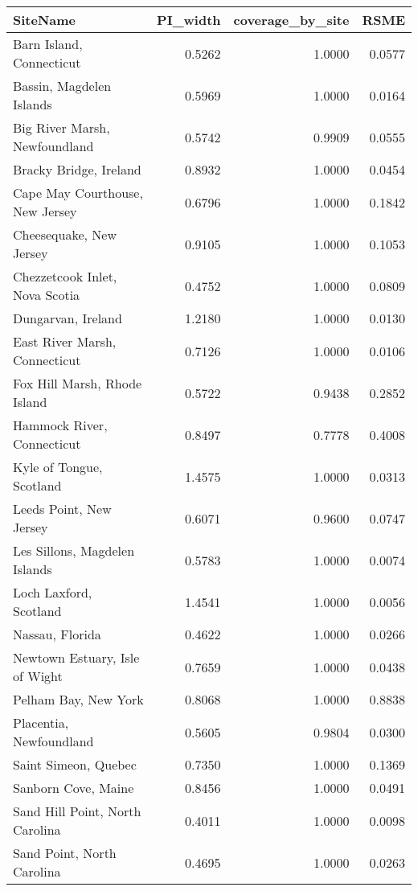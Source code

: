 \begin{table}[ht]
\centering
\begin{tabular}{lrrr}
  \hline
SiteName & PI\_width & coverage\_by\_site & RSME \\ 
  \hline
Barn Island,
 Connecticut & 0.5262 & 1.0000 & 0.0577 \\ 
  Bassin,
 Magdelen Islands & 0.5969 & 1.0000 & 0.0164 \\ 
  Big River Marsh,
 Newfoundland & 0.5742 & 0.9909 & 0.0555 \\ 
  Bracky Bridge,
 Ireland & 0.8932 & 1.0000 & 0.0454 \\ 
  Cape May Courthouse,
 New Jersey & 0.6796 & 1.0000 & 0.1842 \\ 
  Cheesequake,
 New Jersey & 0.9105 & 1.0000 & 0.1053 \\ 
  Chezzetcook Inlet,
 Nova Scotia & 0.4752 & 1.0000 & 0.0809 \\ 
  Dungarvan,
 Ireland & 1.2180 & 1.0000 & 0.0130 \\ 
  East River Marsh,
 Connecticut & 0.7126 & 1.0000 & 0.0106 \\ 
  Fox Hill Marsh,
 Rhode Island & 0.5722 & 0.9438 & 0.2852 \\ 
  Hammock River,
 Connecticut & 0.8497 & 0.7778 & 0.4008 \\ 
  Kyle of Tongue,
 Scotland & 1.4575 & 1.0000 & 0.0313 \\ 
  Leeds Point,
 New Jersey & 0.6071 & 0.9600 & 0.0747 \\ 
  Les Sillons,
 Magdelen Islands & 0.5783 & 1.0000 & 0.0074 \\ 
  Loch Laxford,
 Scotland & 1.4541 & 1.0000 & 0.0056 \\ 
  Nassau,
 Florida & 0.4622 & 1.0000 & 0.0266 \\ 
  Newtown Estuary,
 Isle of Wight & 0.7659 & 1.0000 & 0.0438 \\ 
  Pelham Bay,
 New York & 0.8068 & 1.0000 & 0.8838 \\ 
  Placentia,
 Newfoundland & 0.5605 & 0.9804 & 0.0300 \\ 
  Saint Simeon,
 Quebec & 0.7350 & 1.0000 & 0.1369 \\ 
  Sanborn Cove,
 Maine & 0.8456 & 1.0000 & 0.0491 \\ 
  Sand Hill Point,
 North Carolina & 0.4011 & 1.0000 & 0.0098 \\ 
  Sand Point,
 North Carolina & 0.4695 & 1.0000 & 0.0263 \\ 

\end{tabular}
\end{table}
